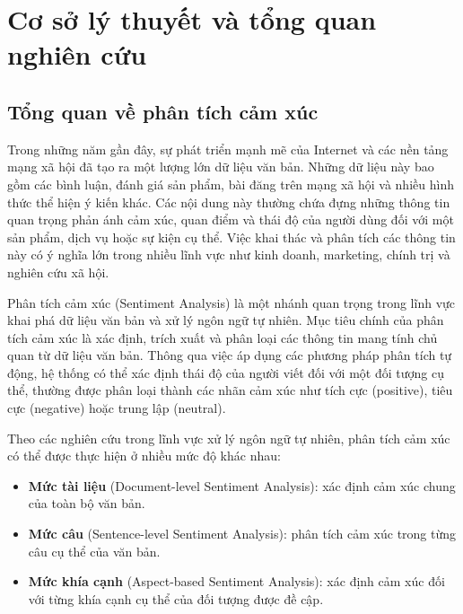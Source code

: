 \documentclass[14pt, a4paper]{report}
\begin{document}
\newpage

\renewcommand{\thesection}{\thechapter.\arabic{section}}
\renewcommand{\thesubsection}{\thechapter.\arabic{section}.\arabic{subsection}}
\renewcommand{\thesubsubsection}{\thechapter.\arabic{section}.\arabic{subsection}.\arabic{subsubsection}}

\chapter{Cơ sở lý thuyết và tổng quan nghiên cứu}
\label{chap:chapter1}

\section{Tổng quan về phân tích cảm xúc}

Trong những năm gần đây, sự phát triển mạnh mẽ của Internet và các nền tảng mạng xã hội đã tạo ra một lượng lớn dữ liệu văn bản. Những dữ liệu này bao gồm các bình luận, đánh giá sản phẩm, bài đăng trên mạng xã hội và nhiều hình thức thể hiện ý kiến khác. Các nội dung này thường chứa đựng những thông tin quan trọng phản ánh cảm xúc, quan điểm và thái độ của người dùng đối với một sản phẩm, dịch vụ hoặc sự kiện cụ thể. Việc khai thác và phân tích các thông tin này có ý nghĩa lớn trong nhiều lĩnh vực như kinh doanh, marketing, chính trị và nghiên cứu xã hội.

Phân tích cảm xúc (Sentiment Analysis) là một nhánh quan trọng trong lĩnh vực khai phá dữ liệu văn bản và xử lý ngôn ngữ tự nhiên. Mục tiêu chính của phân tích cảm xúc là xác định, trích xuất và phân loại các thông tin mang tính chủ quan từ dữ liệu văn bản. Thông qua việc áp dụng các phương pháp phân tích tự động, hệ thống có thể xác định thái độ của người viết đối với một đối tượng cụ thể, thường được phân loại thành các nhãn cảm xúc như tích cực (positive), tiêu cực (negative) hoặc trung lập (neutral).

Theo các nghiên cứu trong lĩnh vực xử lý ngôn ngữ tự nhiên, phân tích cảm xúc có thể được thực hiện ở nhiều mức độ khác nhau:

\begin{itemize}
    \item \textbf{Mức tài liệu} (Document-level Sentiment Analysis): xác định cảm xúc chung của toàn bộ văn bản.
    \item \textbf{Mức câu} (Sentence-level Sentiment Analysis): phân tích cảm xúc trong từng câu cụ thể của văn bản.
    \item \textbf{Mức khía cạnh} (Aspect-based Sentiment Analysis): xác định cảm xúc đối với từng khía cạnh cụ thể của đối tượng được đề cập.
\end{itemize}
\end{document}
